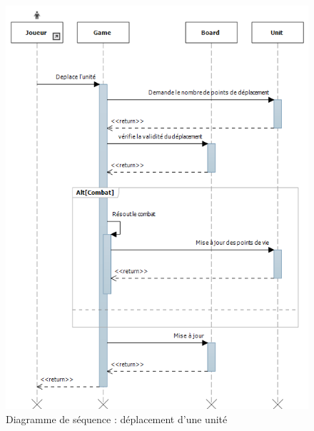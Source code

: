 \begin{figure}[!h]
\centering
\includegraphics[width=\textwidth]{Parties/Images/seq_DeplacementUnite.png}
\caption{Diagramme de séquence : déplacement d'une unité}
\label{fig:seq_DeplacementUnite}
\end{figure}
